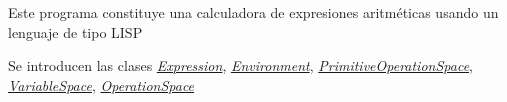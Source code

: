 Este programa constituye una calculadora de expresiones aritméticas usando un lenguaje de tipo L\+I\+SP

Se introducen las clases {\itshape \hyperlink{class_expression}{Expression}}, {\itshape \hyperlink{class_environment}{Environment}}, {\itshape \hyperlink{class_primitive_operation_space}{Primitive\+Operation\+Space}}, {\itshape \hyperlink{class_variable_space}{Variable\+Space}}, {\itshape \hyperlink{class_operation_space}{Operation\+Space}} 